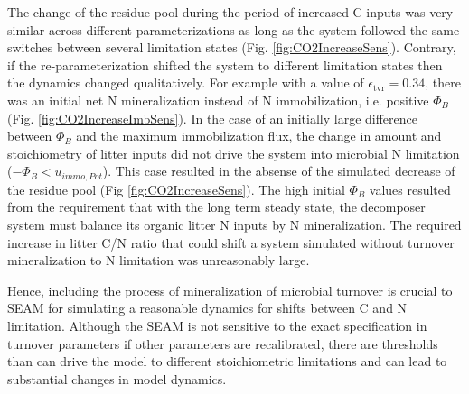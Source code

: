 The change of the residue pool during the period of increased C inputs was very
similar across different parameterizations as long as the system followed the
same switches between several limitation states (Fig.
\ref{fig:CO2IncreaseSens}).
Contrary, if the re-parameterization shifted the system to different limitation
states then the dynamics changed qualitatively.
For example with a value of $\epsilon_{\operatorname{tvr}}=0.34$, there was an
initial net N mineralization instead of N immobilization, i.e. positive $\Phi_B$
(Fig.
\ref{fig:CO2IncreaseImbSens}). In the case of an initially large difference
between $\Phi_B$ and the maximum immobilization flux, the change in amount
and stoichiometry of litter inputs did not drive the system into microbial N
limitation ($-\Phi_B < u_{immo,Pot}$). This case resulted in the absense of the
simulated decrease of the residue pool (Fig \ref{fig:CO2IncreaseSens}).
The high initial $\Phi_B$ values resulted from the requirement that with the
long term steady state, the decomposer system must balance its organic litter N
inputs by N mineralization. The required increase in litter C/N ratio that could
shift a system simulated without turnover mineralization to N limitation was
unreasonably large. 

Hence, including the process of mineralization of microbial turnover is crucial
to SEAM for simulating a reasonable dynamics for shifts between C and N
limitation.
Although the SEAM is not sensitive to the exact specification in turnover
parameters if other parameters are recalibrated, there are thresholds than
can drive the model to different stoichiometric limitations and can lead to
substantial changes in model dynamics.

 

